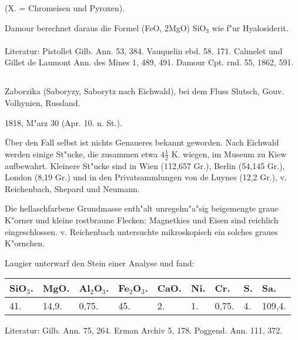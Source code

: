 \documentclass[a4paper, 11pt, oneside]{article}
\begin{document}
(X. = Chromeisen und Pyroxen).

Damour berechnet daraus die Formel (FeO, 2MgO) SiO$_{3}$ wie f"ur Hyalosiderit.
\normalsize
\paragraph{}
Literatur: Pistollet Gilb. Ann. 53, 384. Vauquelin ebd. 58, 171. Calmelet und Gillet de Laumont Ann. des Mines 1, 489, 491. Damour Cpt. rnd. 55, 1862, 591.
\subsection{}
\LARGE
\paragraph{}
Zaborzika (Saboryzy, Saborytz nach Eichwald), bei dem Fluss Slutsch, Gouv. Volhynien, Russland.

1818, M"arz 30 (Apr. 10. n. St.).

Über den Fall selbst ist nichts Genaueres bekannt geworden. Nach Eichwald werden einige St"ucke, die zusammen etwa $\mathfrak{4\frac{1}{2}}$ K. wiegen, im Museum zu Kiew aufbewahrt. Kleinere St"ucke sind in Wien (112,657 Gr.), Berlin (54,145 Gr.), London (8,19 Gr.) und in den Privatsammlungen von de Luynes (12,2 Gr.), v. Reichenbach, Shepard und Neumann.

Die hellaschfarbene Grundmasse enth"alt unregelm"a"sig beigemengte graue K"orner und kleine rostbraune Flecken; Magnetkies und Eisen sind reichlich eingeschlossen. v. Reichenbach untersuchte mikroskopisch ein solches graues K"ornchen.

Laugier unterwarf den Stein einer Analyse und fand:
\begin{table}[!ht]
    \centering\swabfamily\Large
    \begin{tabular}{l l l l l l l l l}
        SiO$_{3}$. & MgO. & Al$_{2}$O$_{3}$. & Fe$_{2}$O$_{3}$. & CaO. & Ni. & Cr. & S. & Sa. \\ \hline
        41. & 14,9. & 0,75. & 45. & 2. & 1. & 0,75. & 4. & 109,4. \\
    \end{tabular}
\end{table}

\normalsize
Literatur: Gilb. Ann. 75, 264. Erman Archiv 5, 178. Poggend. Ann. 111, 372.
\subsection{}
\LARGE
\end{document}
